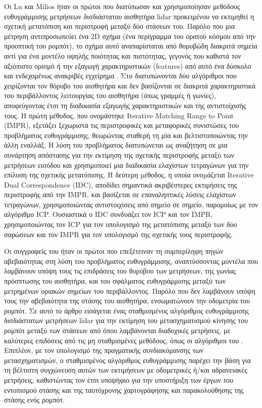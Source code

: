 Οι Lu και Milios ήταν οι πρώτοι που διατύπωσαν και χρησιμοποίησαν μεθόδους
ευθυγράμμισης μετρήσεων δισδιάστατου αισθητήρα lidar προκειμένου να εκτιμηθεί η
σχετική μετατόπιση και περιστροφή μεταξύ δύο στάσεων του. Παρόλο που μια
μέτρηση αντιπροσωπεύει ένα 2D σχήμα (ένα περίγραμμα του ορατού κόσμου από την
προοπτική του ρομπότ), το σχήμα αυτό αναπαρίσταται από θορυβώδη διακριτά σημεία
αντί για ένα μοντέλο υψηλής ποιότητας και πιστότητας, γεγονός που καθιστά τον
αξιόπιστο ορισμό ή την εξαγωγή χαρακτηριστικών (features) από αυτό ένα δύσκολο
και ενδεχομένως ανακριβές εγχείρημα \cite{Grimson}. Στο \cite{FengLu1994a}
διατυπώνονται δύο αλγόριθμοι που χειρίζονται τον θόρυβο του αισθητήρα και δεν
βασίζονται σε διακριτά χαρακτηριστικά του περιβάλλοντος λειτουργίας του
αισθητήρα (όπως γραμμές ή γωνίες), αποφεύγοντας έτσι τη διαδικασία εξαγωγής
χαρακτηριστικών και της αντιστοίχισής τους. Η πρώτη μέθοδος, που ονομάστηκε
Iterative Matching Range to Point (IMPR), εξετάζει ξεχωριστά τις περιστροφικές
και μεταφορικές συνιστώσες του προβλήματος ευθυγράμμισης, θεωρώντας σταθερή
τη μία και βελτιστοποιώντας την άλλη εναλλάξ. Η λύση του προβλήματος
διατυπώνεται ως αναζήτηση σε μια συνάρτηση απόστασης για την εκτίμηση της
σχετικής περιστροφής μεταξύ των μετρήσεων εισόδου και χρησιμοποιεί μια
διαδικασία ελαχίστων τετραγώνων για την επίλυση της σχετικής μετατόπισης. Η
δεύτερη µέθοδος, η οποία ονοµάζεται Iterative Dual Correspondence (IDC),
αποδίδει σημαντικά ακριβέστερες εκτιμήσεις της περιστροφής από την IMPR, και
βασίζεται σε επαναληπτικές λύσεις ελαχίστων τετραγώνων, χρησιμοποιώντας
αντιστοιχίσεις από σημείο σε σημείο, παρομοίως με τον αλγόριθμο ICP. Ουσιαστικά
ο IDC συνδυάζει τον ICP και τον IMPR, χρησιμοποιώντας τον ICP για τον υπολογισμό
της μετατόπισης μεταξύ των δύο σαρώσεων και τον IMPR για τον υπολογισμό της
σχετικής τους περιστροφής.

Οι συγγραφείς του \cite{Pfistera} ήταν οι πρώτοι που επεξέτειναν τη συμπερίληψη
πηγών αβεβαιότητας στη λύση του προβλήματος ευθυγράμμισης, αναπτύσσοντας
μοντέλα που λαμβάνουν υπόψη τους τις επιδράσεις του θορύβου των μετρήσεων, της
γωνίας πρόσπτωσης του αισθητήρα, και του σφάλματος ευθυγράμμισης μεταξύ των
μετρημένων οριακών σημείων του περιβάλλοντος. Παρόλο που δεν λαμβάνουν υπόψη
τους την αβεβαιότητα της στάσης του αισθητήρα, ενσωματώνουν την οδομετρία του
ρομπότ. Σε αυτό το άρθρο εισάγεται ένας σταθμισμένος αλγόριθμος ευθυγράμμισης
δισδιάστατων μετρήσεων lidar για την εκτίμηση του μετασχηματισμού
κίνησης του ρομπότ μεταξύ των στάσεων από όπου λαμβάνονται διαδοχικές
μετρήσεις, με καλύτερες επιδόσεις από τις μη σταθμισμένες μεθόδους, όπως οι
αλγόριθμοι του \cite{FengLu1994a}.  Επιπλέον, με τον υπολογισμό της πραγματικής
συνδιακύμανσης των μετασχηματισμών, ο σταθμισμένος αλγόριθμος ευθυγράμμισης
παρέχει την βάση για τη βέλτιστη συγχώνευση αυτών των εκτιμήσεων με οδομετρικές
ή/και αδρανειακές μετρήσεις, καθιστώντας τον έτσι υποψήφιο για την υποστήριξη
των έργων του εντοπισμού στάσης και της ταυτόχρονης χαρτογράφησης και
παρακολούθησης της στάσης ενός ρομπότ.

